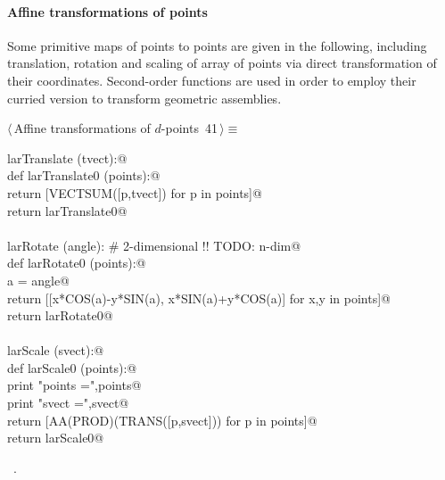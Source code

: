 \documentclass[11pt,oneside]{article}    %
\begin{document}
\paragraph{Affine transformations of points} Some primitive maps of points to points are given in the following, including translation, rotation and scaling of array of points via direct transformation of their coordinates. Second-order functions are used in order to employ their curried version to transform geometric assemblies.

\begin{flushleft} \small \label{scrap68}
\protect{}$\langle\,$Affine transformations of $d$-points\nobreak\ {\footnotesize 41}$\,\rangle\equiv$
\vspace{-1ex}
\begin{list}{}{} \item
\mbox{}\verb@def larTranslate (tvect):@\\
\mbox{}\verb@    def larTranslate0 (points):@\\
\mbox{}\verb@        return [VECTSUM([p,tvect]) for p in points]@\\
\mbox{}\verb@    return larTranslate0@\\
\mbox{}\verb@@\\
\mbox{}\verb@def larRotate (angle):        # 2-dimensional !! TODO: n-dim@\\
\mbox{}\verb@    def larRotate0 (points):@\\
\mbox{}\verb@        a = angle@\\
\mbox{}\verb@        return [[x*COS(a)-y*SIN(a), x*SIN(a)+y*COS(a)] for x,y in points]@\\
\mbox{}\verb@    return larRotate0@\\
\mbox{}\verb@@\\
\mbox{}\verb@def larScale (svect):@\\
\mbox{}\verb@    def larScale0 (points):@\\
\mbox{}\verb@        print "\n points =",points@\\
\mbox{}\verb@        print "\n svect =",svect@\\
\mbox{}\verb@        return [AA(PROD)(TRANS([p,svect])) for p in points]@\\
\mbox{}\verb@    return larScale0@\\
\mbox{}\verb@@{\NWsep}
\end{list}
\vspace{-1ex}
\footnotesize\addtolength{\baselineskip}{-1ex}
\begin{list}{}{\setlength{\itemsep}{-\parsep}\setlength{\itemindent}{-\leftmargin}}
\item \NWtxtMacroRefIn\ .
\end{list}
\end{flushleft}
\end{document}
